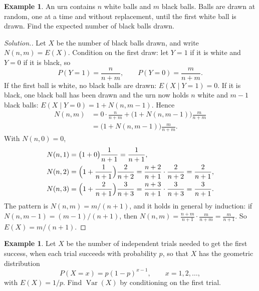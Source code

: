 \documentclass[11pt,a4paper]{article}
\theoremstyle{definition}
\newtheorem{exa}[thm]{Example}
\newenvironment{solution}
  {\renewcommand{\qedsymbol}{}\begin{proof}[\textit{Solution}.]}
  {\end{proof}}
\DeclareMathOperator{\Var}{Var}
\begin{document}
\begin{exa}\label{exa:urn-black}
An urn contains $n$ white balls and $m$ black balls. Balls are drawn at random, one at a time and without replacement, until the
first white ball is drawn. Find the expected number of black balls drawn.
\end{exa}

\begin{solution}
Let $X$ be the number of black balls drawn, and write $N(n, m) = E(X)$. Condition on the first draw: let $Y = 1$ if it is white and $Y = 0$
if it is black, so
\[
P(Y = 1) = \frac{n}{n + m} , \qquad P(Y = 0) = \frac{m}{n + m} .
\]
If the first ball is white, no black balls are drawn: $E(X \mid Y = 1) = 0$. If it is black, one black ball has been drawn and the urn
now holds $n$ white and $m - 1$ black balls: $E(X \mid Y = 0) = 1 + N(n, m - 1)$. Hence
\begin{align*}
N(n, m) &= 0 \cdot \frac{n}{n + m} + \bigl(1 + N(n, m - 1)\bigr)\frac{m}{n + m} \\
&= \bigl(1 + N(n, m - 1)\bigr)\frac{m}{n + m} .
\end{align*}
With $N(n, 0) = 0$,
\begin{align*}
N(n, 1) &= \bigl(1 + 0\bigr)\frac{1}{n + 1} = \frac{1}{n + 1} , \\
N(n, 2) &= \Bigl(1 + \frac{1}{n + 1}\Bigr)\frac{2}{n + 2} = \frac{n + 2}{n + 1}\cdot\frac{2}{n + 2} = \frac{2}{n + 1} , \\
N(n, 3) &= \Bigl(1 + \frac{2}{n + 1}\Bigr)\frac{3}{n + 3} = \frac{n + 3}{n + 1}\cdot\frac{3}{n + 3} = \frac{3}{n + 1} .
\end{align*}
The pattern is $N(n, m) = m/(n + 1)$, and it holds in general by induction: if $N(n, m - 1) = (m - 1)/(n + 1)$, then
$N(n, m) = \frac{n + m}{n + 1}\cdot\frac{m}{n + m} = \frac{m}{n + 1}$. So $E(X) = m/(n + 1)$.
\end{solution}

\begin{exa}\label{exa:geometric-var}
Let $X$ be the number of independent trials needed to get the first success, when each trial succeeds with probability $p$, so that $X$
has the geometric distribution
\[
P(X = x) = p(1 - p)^{x-1} , \qquad x = 1, 2, \dots ,
\]
with $E(X) = 1/p$. Find $\Var(X)$ by conditioning on the first trial.
\end{exa}
\end{document}
